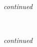 \begin{figure}[!htbp]
 \ContinuedFloat
 \\
 \caption[]{\emph{continued}}
\end{figure}
\begin{figure}[!htbp]
 \ContinuedFloat
 \\
 \caption[]{\emph{continued}}
\end{figure}

